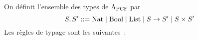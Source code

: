 \documentclass{article}
\begin{document}
\begin{defi}[$\LamP$]
  On définit l'ensemble des types de $\LamP$ par
  \[S,S' ::= \Nat\mid\Bool\mid\List\mid S \to S' \mid S \times S'\]
  Les règles de typage sont les suivantes~:
  \begin{center}
    \begin{prooftree}
    \end{prooftree}
    \quad
    \begin{prooftree}
    \end{prooftree}
    \quad
    \begin{prooftree}
    \end{prooftree}

    \vspace{0.5cm}

    \begin{prooftree}
    \end{prooftree}
    \quad
    \begin{prooftree}
    \end{prooftree}
    \quad
    \begin{prooftree}
    \end{prooftree}

    \vspace{0.5cm}

    \begin{prooftree}
    \end{prooftree}
    \quad
    \begin{prooftree}
    \end{prooftree}
    \quad
    \begin{prooftree}
    \end{prooftree}

    \vspace{0.5cm}


\end{center}
\end{defi}
\end{document}
